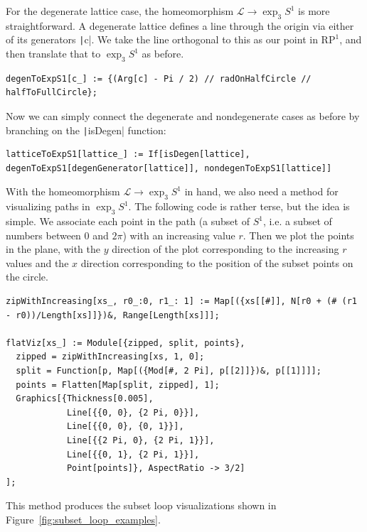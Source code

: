 \documentclass[12pt,twoside]{reedthesis}
\theoremstyle{definition}
\newcommand{\LS}{\mathcal{L}}
\begin{document}
For the degenerate lattice case, the homeomorphism $\LS \to \exp_3 S^1$ is more straightforward.
A degenerate lattice defines a line through the origin via either of its generators \texttt|c|.
We take the line orthogonal to this as our point in $\mathrm{RP}^1$, and then translate that to $\exp_3 S^1$ as before.
\begin{verbatim}
degenToExpS1[c_] := {(Arg[c] - Pi / 2) // radOnHalfCircle // halfToFullCircle};
\end{verbatim}
Now we can simply connect the degenerate and nondegenerate cases as before by branching on the \texttt|isDegen| function:
\begin{verbatim}
latticeToExpS1[lattice_] := If[isDegen[lattice], degenToExpS1[degenGenerator[lattice]], nondegenToExpS1[lattice]]
\end{verbatim}
With the homeomorphism $\LS \to \exp_3 S^1$ in hand, we also need a method for visualizing paths in $\exp_3 S^1$.
The following code is rather terse, but the idea is simple.
We associate each point in the path (a subset of $S^1$, i.e.
a subset of numbers between 0 and $2\pi$) with an increasing value $r$.
Then we plot the points in the plane, with the $y$ direction of the plot corresponding to the increasing $r$ values and the $x$ direction corresponding to the position of the subset points on the circle.
\begin{verbatim}
zipWithIncreasing[xs_, r0_:0, r1_: 1] := Map[({xs[[#]], N[r0 + (# (r1 - r0))/Length[xs]]})&, Range[Length[xs]]];

flatViz[xs_] := Module[{zipped, split, points},
  zipped = zipWithIncreasing[xs, 1, 0];
  split = Function[p, Map[({Mod[#, 2 Pi], p[[2]]})&, p[[1]]]];
  points = Flatten[Map[split, zipped], 1];
  Graphics[{Thickness[0.005],
            Line[{{0, 0}, {2 Pi, 0}}],
            Line[{{0, 0}, {0, 1}}],
            Line[{{2 Pi, 0}, {2 Pi, 1}}],
            Line[{{0, 1}, {2 Pi, 1}}],
            Point[points]}, AspectRatio -> 3/2]
];
\end{verbatim}
This method produces the subset loop visualizations shown in Figure~\ref{fig:subset_loop_examples}.

\newpage
\printbibliography
\end{document}
